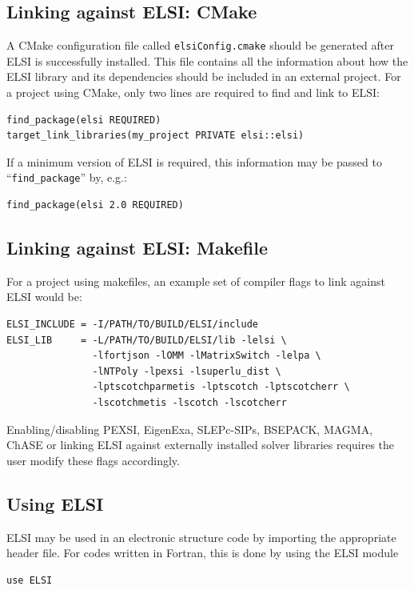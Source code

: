 \documentclass{report}
\begin{document}
\subsection{Linking against ELSI: CMake}
\label{subsec:import_cmake}
A CMake configuration file called \texttt{elsiConfig.cmake} should be generated after ELSI is successfully installed. This file contains all the information about how the ELSI library and its dependencies should be included in an external project. For a project using CMake, only two lines are required to find and link to ELSI:
\begin{tcolorbox}
\begin{verbatim}
find_package(elsi REQUIRED)
target_link_libraries(my_project PRIVATE elsi::elsi)
\end{verbatim}
\end{tcolorbox}

If a minimum version of ELSI is required, this information may be passed to ``\texttt{find\_package}'' by, e.g.:
\begin{tcolorbox}
\begin{verbatim}
find_package(elsi 2.0 REQUIRED)
\end{verbatim}
\end{tcolorbox}

\subsection{Linking against ELSI: Makefile}
\label{subsec:import_makefile}
For a project using makefiles, an example set of compiler flags to link against ELSI would be:
\begin{tcolorbox}
\begin{verbatim}
ELSI_INCLUDE = -I/PATH/TO/BUILD/ELSI/include
ELSI_LIB     = -L/PATH/TO/BUILD/ELSI/lib -lelsi \
               -lfortjson -lOMM -lMatrixSwitch -lelpa \
               -lNTPoly -lpexsi -lsuperlu_dist \
               -lptscotchparmetis -lptscotch -lptscotcherr \
               -lscotchmetis -lscotch -lscotcherr
\end{verbatim}
\end{tcolorbox}

Enabling/disabling PEXSI, EigenExa, SLEPc-SIPs, BSEPACK, MAGMA, ChASE or linking ELSI against externally installed solver libraries requires the user modify these flags accordingly.

\subsection{Using ELSI}
\label{subsec:import_use}
ELSI may be used in an electronic structure code by importing the appropriate header file. For codes written in Fortran, this is done by using the ELSI module
\begin{tcolorbox}
\begin{verbatim}
use ELSI
\end{verbatim}
\end{tcolorbox}
\end{document}
